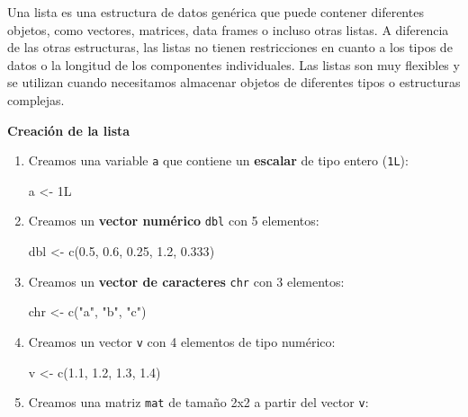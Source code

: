 \documentclass[
  a4paper,
]{article}
\newenvironment{Shaded}{}{}
\newcommand{\DecValTok}[1]{\textcolor[rgb]{0.00,0.36,0.77}{#1}}
\newcommand{\FloatTok}[1]{\textcolor[rgb]{0.00,0.36,0.77}{#1}}
\newcommand{\FunctionTok}[1]{\textcolor[rgb]{0.44,0.26,0.76}{#1}}
\newcommand{\NormalTok}[1]{\textcolor[rgb]{0.14,0.16,0.18}{#1}}
\newcommand{\OtherTok}[1]{\textcolor[rgb]{0.44,0.26,0.76}{#1}}
\newcommand{\StringTok}[1]{\textcolor[rgb]{0.01,0.18,0.38}{#1}}
\begin{document}
Una lista es una estructura de datos genérica que puede contener
diferentes objetos, como vectores, matrices, data frames o incluso otras
listas. A diferencia de las otras estructuras, las listas no tienen
restricciones en cuanto a los tipos de datos o la longitud de los
componentes individuales. Las listas son muy flexibles y se utilizan
cuando necesitamos almacenar objetos de diferentes tipos o estructuras
complejas.

\textbf{Creación de la lista}

\begin{enumerate}
\def\labelenumi{\arabic{enumi}.}
\item
  Creamos una variable \texttt{a} que contiene un \textbf{escalar} de
  tipo entero (\texttt{1L}):

\begin{Shaded}
\begin{Highlighting}[]
\NormalTok{a }\OtherTok{\textless{}{-}} \DecValTok{1}\NormalTok{L}
\end{Highlighting}
\end{Shaded}
\item
  Creamos un \textbf{vector numérico} \texttt{dbl} con 5 elementos:

\begin{Shaded}
\begin{Highlighting}[]
\NormalTok{dbl }\OtherTok{\textless{}{-}} \FunctionTok{c}\NormalTok{(}\FloatTok{0.5}\NormalTok{, }\FloatTok{0.6}\NormalTok{, }\FloatTok{0.25}\NormalTok{, }\FloatTok{1.2}\NormalTok{, }\FloatTok{0.333}\NormalTok{)}
\end{Highlighting}
\end{Shaded}
\item
  Creamos un \textbf{vector de caracteres} \texttt{chr} con 3 elementos:

\begin{Shaded}
\begin{Highlighting}[]
\NormalTok{chr }\OtherTok{\textless{}{-}} \FunctionTok{c}\NormalTok{(}\StringTok{"a"}\NormalTok{, }\StringTok{"b"}\NormalTok{, }\StringTok{"c"}\NormalTok{)}
\end{Highlighting}
\end{Shaded}
\item
  Creamos un vector \texttt{v} con 4 elementos de tipo numérico:

\begin{Shaded}
\begin{Highlighting}[]
\NormalTok{v }\OtherTok{\textless{}{-}} \FunctionTok{c}\NormalTok{(}\FloatTok{1.1}\NormalTok{, }\FloatTok{1.2}\NormalTok{, }\FloatTok{1.3}\NormalTok{, }\FloatTok{1.4}\NormalTok{)}
\end{Highlighting}
\end{Shaded}
\item
  Creamos una matriz \texttt{mat} de tamaño 2x2 a partir del vector
  \texttt{v}:


\end{enumerate}
\end{document}
